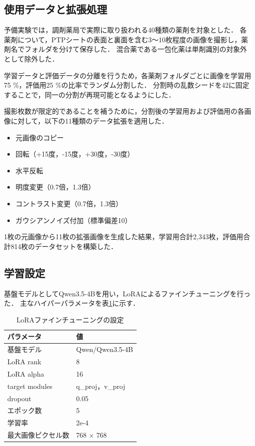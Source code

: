 \documentclass{ltjsarticle}
\begin{document}
\subsection{使用データと拡張処理}

予備実験では，調剤薬局で実際に取り扱われる40種類の薬剤を対象とした．
各薬剤について，PTPシートの表面と裏面を含む3〜10枚程度の画像を撮影し，薬剤名でフォルダを分けて保存した．
混合薬である一包化薬は単剤識別の対象外として除外した．

学習データと評価データの分離を行うため，各薬剤フォルダごとに画像を学習用75 \%，評価用25 \%の比率でランダム分割した．
分割時の乱数シードを42に固定することで，同一の分割が再現可能となるようにした．

撮影枚数が限定的であることを補うために，分割後の学習用および評価用の各画像に対して，以下の11種類のデータ拡張を適用した．

\begin{itemize}
  \item 元画像のコピー
  \item 回転（+15度，-15度，+30度，-30度）
  \item 水平反転
  \item 明度変更（0.7倍，1.3倍）
  \item コントラスト変更（0.7倍，1.3倍）
  \item ガウシアンノイズ付加（標準偏差10）
\end{itemize}

1枚の元画像から11枚の拡張画像を生成した結果，学習用合計2,343枚，評価用合計814枚のデータセットを構築した．

\subsection{学習設定}

基盤モデルとしてQwen3.5-4Bを用い，LoRAによるファインチューニングを行った．
主なハイパーパラメータを表\ref{tab:lora_config}に示す．

\begin{table}[h]
\centering
\caption{LoRAファインチューニングの設定}
\label{tab:lora_config}
\begin{tabular}{ll}
\hline
パラメータ & 値 \\
\hline
基盤モデル & Qwen/Qwen3.5-4B \\
LoRA rank & 8 \\
LoRA alpha & 16 \\
target modules & q\_proj，v\_proj \\
dropout & 0.05 \\
エポック数 & 5 \\
学習率 & 2e-4 \\
最大画像ピクセル数 & 768 $\times$ 768 \\
\hline
\end{tabular}
\end{table}
\end{document}
